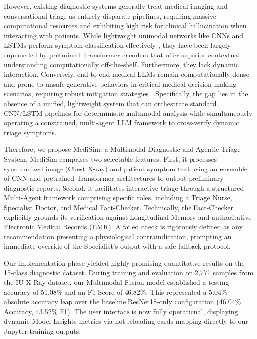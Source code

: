 \documentclass[11pt,a4paper]{article}
\begin{document}
However, existing diagnostic systems generally treat medical imaging and conversational triage as entirely disparate pipelines, requiring massive computational resources and exhibiting high risk for clinical hallucination when interacting with patients. While lightweight unimodal networks like CNNs and LSTMs perform symptom classification effectively \citep{mullenbach2018explainable}, they have been largely superseded by pretrained Transformer encoders that offer superior contextual understanding computationally off-the-shelf. Furthermore, they lack dynamic interaction. Conversely, end-to-end medical LLMs remain computationally dense and prone to unsafe generative behaviors in critical medical decision-making scenarios, requiring robust mitigation strategies \citep{sahu2025occutriage}. Specifically, the gap lies in the absence of a unified, lightweight system that can orchestrate standard CNN/LSTM pipelines for deterministic multimodal analysis while simultaneously operating a constrained, multi-agent LLM framework to cross-verify dynamic triage symptoms.

Therefore, we propose MediSim: a Multimodal Diagnostic and Agentic Triage System. MediSim comprises two selectable features. First, it processes synchronized image (Chest X-ray) and patient symptom text using an ensemble of CNN and pretrained Transformer architectures to output preliminary diagnostic reports. Second, it facilitates interactive triage through a structured Multi-Agent framework comprising specific roles, including a Triage Nurse, Specialist Doctor, and Medical Fact-Checker. Technically, the Fact-Checker explicitly grounds its verification against Longitudinal Memory and authoritative Electronic Medical Records (EMR). A failed check is rigorously defined as any recommendation presenting a physiological contraindication, prompting an immediate override of the Specialist's output with a safe fallback protocol.

Our implementation phase yielded highly promising quantitative results on the 15-class diagnostic dataset. During training and evaluation on 2,771 samples from the IU X-Ray dataset, our Multimodal Fusion model established a testing accuracy of 51.08\% and an F1-Score of 46.82\%. This represented a 5.04\% absolute accuracy leap over the baseline ResNet18-only configuration (46.04\% Accuracy, 43.52\% F1). The user interface is now fully operational, displaying dynamic Model Insights metrics via hot-reloading cards mapping directly to our Jupyter training outputs.
\end{document}
